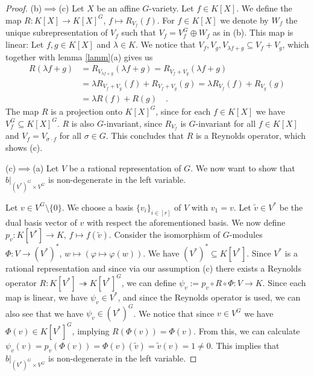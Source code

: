 \begin{proof}
  (b)$\implies$(c) \; Let $X$ be an affine $G$-variety.
  Let $f \in K[X]$.
  We define the map \linebreak$R \colon K[X] \rightarrow K[X]^G $, $ f \mapsto R_{V_f}(f)$. %
  For $f \in K[X]$ we denote by $W_f$ the unique subrepresentation of $V_f$ such that $V_f = V_f^G \oplus W_f$ as in (b). %
  This map is linear:
  Let $f,g \in K[X]$ and $\lambda \in K$.
  We notice that $V_f,V_g,V_{\lambda f + g} \subseteq V_f + V_g$, which together with lemma \ref{lamm}(a) gives us %
  \begin{equation*}
    \begin{aligned}
      R(\lambda f +g)
      &= R_{V_{\lambda f +g}}(\lambda f+g)  
      = R_{V_f +V_g}(\lambda f+g)  \\
      &= \lambda R_{V_f + V_g} (f) + R_{V_f + V_g}(g)  
      = \lambda R_{V_f} (f) + R_{V_g}(g)\\
      &= \lambda R(f) + R(g) \quad .
    \end{aligned}
  \end{equation*}
  The map $R$ is a projection onto $K[X]^G$, since for each $f \in K[X]$ we have $V_f^G \subseteq K[X]^G$. %
  $R$ is also $G$-invariant, since $R_{V_f}$ is $G$-invariant for all $f \in K[X]$ and  $V_f = V_{\sigma\cdot f}$ for all $\sigma \in G$.
  This concludes that $R$ is a Reynolds operator, which shows (c).
  
  (c)$\implies$(a) \; Let $V$ be a rational representation of $G$.
  We now want to show that $\left. b\right|_{(V^\ast)^G \times V^G}$ is non-degenerate in the left variable.
  
  Let $v \in V^G \setminus \{0\}$.
  We choose a basis $\{v_i\}_{i\in [r]}$ of $V$ with $v_1 = v$.
  Let $\tilde{v} \in V^\ast$ be the dual basis vector of $v$ with respect the aforementioned basis.
  We now define $p_v \colon K[V^\ast] \rightarrow K$, $f \mapsto f(\tilde{v})$.
  Consider the isomorphism of $G$-modules $\Phi \colon V \rightarrow (V^\ast)^\ast$, $w \mapsto (\varphi \mapsto \varphi (w))$.
  We have $(V^\ast)^\ast \subseteq K[V^\ast]$.
  Since $V^\ast$ is a rational representation and since via our assumption (c) there exists a Reynolds operator $R \colon K[V^\ast] \twoheadrightarrow K[V^\ast]^G$, we can define $ \psi_v := p_v \circ R \circ \Phi \colon V \rightarrow K$.
  Since each map is linear, we have $\psi_v \in V^\ast$, and since the Reynolds operator is used, we can also see that we have $\psi_v \in (V^\ast)^G$.
  We notice that since $v \in V^G$ we have $\Phi (v) \in K[V^\ast]^G$, implying $R(\Phi(v))=\Phi(v)$.
  From this, we can calculate $\psi_v (v) = p_v (\Phi(v)) = \Phi (v) (\tilde{v}) = \tilde{v} (v) = 1 \neq 0$.
  This implies that $\left. b\right|_{(V^\ast)^G \times V^G}$ is non-degenerate in the left variable.
  

\end{proof}
